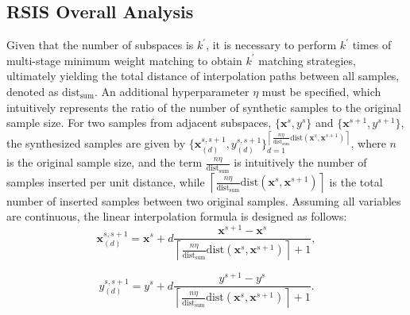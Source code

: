 \documentclass[lettersize,journal]{IEEEtran}
\begin{document}
\subsection{RSIS Overall Analysis}
Given that the number of subspaces is $k^\prime$, it is necessary 
to perform $k^\prime$ times of multi-stage minimum weight matching 
to obtain $k^\prime$ matching strategies, ultimately yielding 
the total distance of interpolation paths between all samples, 
denoted as $\text{dist}_{\text{sum}}$. An additional 
hyperparameter $\eta$ must be specified, which intuitively 
represents the ratio of the number of synthetic samples to the 
original sample size. For two samples from adjacent subspaces, 
$\{\boldsymbol{x}^s,y^s\}$ and $\{\boldsymbol{x}^{s+1},y^{s+1}\}$, 
the synthesized samples are given by $\{\boldsymbol{x}_{(d)}^
{s,s+1},y_{(d)}^{s,s+1} \}_{d=1}^{\left\lceil \frac{n\eta }
{\text{dist}_{\text{sum}}}\text{dist}(\boldsymbol{x}^s,
\boldsymbol{x}^{s+1})\right\rceil}$, where $n$ is the original 
sample size, and the term $\frac{n\eta}{\text{dist}_{\text{sum}}}$
 is intuitively the number of samples inserted per unit distance, 
 while $\left\lceil \frac{n\eta}{\text{dist}_{\text{sum}}}
 \text{dist}(\boldsymbol{x}^s,\boldsymbol{x}^{s+1})\right\rceil$ 
 is the total number of inserted samples between two original 
 samples. Assuming all variables are continuous, 
 the linear interpolation formula is designed as follows:
\begin{equation}
\label{eq16}
\boldsymbol{x}^{s,s+1}_{(d)}=\boldsymbol{x}^s+d\dfrac
{\boldsymbol{x}^{s+1}-\boldsymbol{x}^{s}}{\left\lceil 
\frac{n\eta}{\text{dist}_{\text{sum}}}\text{dist}
(\boldsymbol{x}^s,\boldsymbol{x}^{s+1})\right\rceil+1},
\end{equation}

\begin{equation}
\label{eq17}
y^{s,s+1}_{(d)}=y^s+d\dfrac{y^{s+1}-y^{s}}{\left\lceil 
\frac{n\eta}{\text{dist}_{\text{sum}}}\text{dist}
(\boldsymbol{x}^s,\boldsymbol{x}^{s+1})\right\rceil+1}.
\end{equation}
\end{document}
